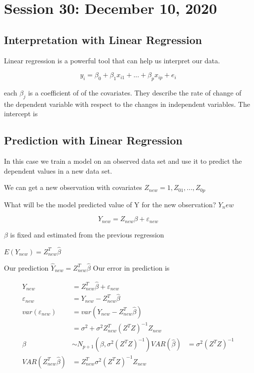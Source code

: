\chapter{Session 30: December 10, 2020}

\section{Interpretation with Linear Regression}
Linear regression is a powerful tool that can help us interpret our data.

\[y_i = \beta_0 + \beta_1 x_{i1} +...+\beta_px_{ip}+e_i\]

each $\beta_j$ is a coefficient of of the covariates. They describe the rate of change of the dependent variable with respect to the changes in independent variables. The intercept is 

\section{Prediction with Linear Regression}

In this case we train a model on an observed data set and use it to predict the dependent values in a new data set.

We can get a new observation with covariates $Z_{new} = 1, Z_{01},...,Z_{0p}$

What will be the model predicted value of Y for the new observation? $Y_new$

\[Y_{new} = Z_{new} \beta + \varepsilon_{new}\]

$\beta$ is fixed and estimated from the previous regression 

$E(Y_{new}) = Z_{new}^T\hat{\beta}$

Our prediction $\hat{Y}_{new} = Z_{new}^T\hat{\beta}$
Our error in prediction is 

\begin{align*}
    Y_{new} &= Z_{new}^T\hat{\beta}+\varepsilon_{new}\\
    \varepsilon_{new} &= Y_{new}- Z^T_{new}\hat{\beta}
    \\
    var(\varepsilon_{new})&= var(Y_{new}- Z^T_{new}\hat{\beta})\\
    &= \sigma^2 + \sigma^2Z_{new}^T(Z^TZ)^{-1}Z_{new}\\
    \hat{\beta} &\sim N_{p+1}(\beta,\sigma^2(Z^TZ)^{-1})
    VAR(\hat{\beta}) &= \sigma^2(Z^TZ)^{-1}\\
    VAR(Z_{new}^T\hat{\beta}) &= Z_{new}^T\sigma^2(Z^TZ)^{-1}Z_{new}
\end{align*}

